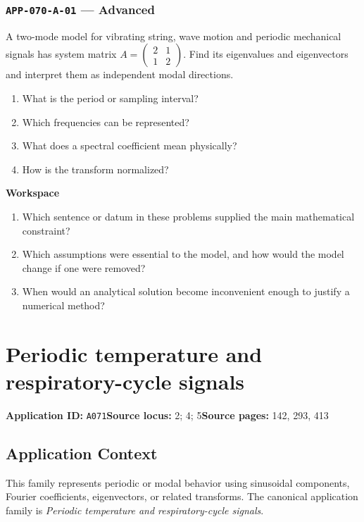 \documentclass[11pt]{book}
\newcommand{\pid}[1]{\texttt{#1}}
\newcommand{\workspace}{\par\vspace{0.7in}\hrulefill\par\vspace{0.55in}\hrulefill\par}
\begin{document}
\subsection*{\pid{APP-070-A-01} — Advanced}
\begin{problembox}
A two-mode model for vibrating string, wave motion and periodic mechanical signals has system matrix $A=\begin{pmatrix}2&1\\1&2\end{pmatrix}$. Find its eigenvalues and eigenvectors and interpret them as independent modal directions.
\end{problembox}
\begin{promptbox}\begin{enumerate}
\item What is the period or sampling interval?
\item Which frequencies can be represented?
\item What does a spectral coefficient mean physically?
\item How is the transform normalized?
\end{enumerate}\end{promptbox}
\textbf{Workspace}\workspace
\begin{reflectionbox}\begin{enumerate}
\item Which sentence or datum in these problems supplied the main mathematical constraint?
\item Which assumptions were essential to the model, and how would the model change if one were removed?
\item When would an analytical solution become inconvenient enough to justify a numerical method?
\end{enumerate}\end{reflectionbox}
\chapter{Periodic temperature and respiratory-cycle signals}\label{app:A071}
\textbf{Application ID:} \pid{A071}\quad \textbf{Source locus:} 2; 4; 5\quad \textbf{Source pages:} 142, 293, 413
\section*{Application Context}
This family represents periodic or modal behavior using sinusoidal components, Fourier coefficients, eigenvectors, or related transforms. The canonical application family is \emph{Periodic temperature and respiratory-cycle signals}.
\end{document}
